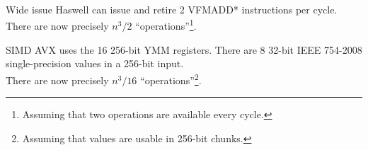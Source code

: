\documentclass[mathserif,xcolor={dvipsnames,table}]{beamer}
\begin{document}
{
%
\begin{frame}[b]{Wide issue}
\scriptsize{
Haswell can issue and retire 2 VFMADD* instructions per cycle.\\
There are now precisely $n^{3}/2$ ``operations''\footnote{\tiny{Assuming that two operations are available every cycle.}}.
\vspace{.1in}
}
\end{frame}
}

{
%
\begin{frame}[b]{SIMD}
\scriptsize{
AVX uses the 16 256-bit YMM registers. There are 8 32-bit IEEE 754-2008
single-precision values in a 256-bit input.\\
There are now precisely $n^{3}/16$ ``operations''\footnote{Assuming that values
are usable in 256-bit chunks.}.
\vspace{.1in}
}
\end{frame}
}
\end{document}
